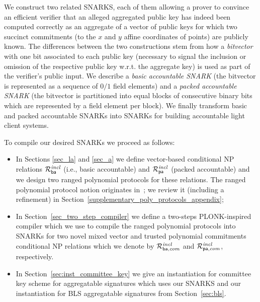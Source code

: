 \label{sec:snarks}

We construct two related SNARKS, each of them allowing a prover to convince an 
efficient verifier that an alleged aggregated public key has indeed been computed correctly as an aggregate 
of a vector of public keys for which two succinct commitments (to the $x$ and $y$ affine coordinates of points) are publicly known. The differences between the two  
constructions stem from how a \emph{bitvector} with one bit associated to each public key 
(necessary to signal the inclusion or omission of the respective public key w.r.t. the aggregate key) 
is used as part of the verifier's public input. We describe a 
\emph{basic accountable SNARK} (the bitvector is represented as a sequence of $0/1$ field elements) and a \emph{packed accountable SNARK} (the bitvector is 
partitioned into equal blocks of consecutive binary bits which are represented by a field element per block). 
We finally transform basic and packed accountable SNARKs into SNARKs for building accountable light client systems. 

\noindent To compile our desired SNARKs we proceed as follows:
\begin{itemize}
\item In Sections \ref{sec_la} and \ref{sec_a} we define vector-based conditional NP relations $\mathcal{R}^{\mathit{incl}}_{\mathsf{ba}}$ (i.e., basic accountable) and $\mathcal{R}^{\mathit{incl}}_{\mathsf{pa}}$ (packed accountable) and we design two ranged polynomial protocols for these relations. The ranged polynomial protocol notion originates in~\cite{plonk}; 
we review it (including a refinement) in Section~\ref{supplementary_poly_protocols_appendix};  
\item In Section~\ref{sec_two_step_compiler} we define a two-steps PLONK-inspired compiler which we use to compile the ranged polynomial protocols into 
SNARKs for two novel mixed vector and trusted polynomial commitments conditional NP relations which we denote by 
$\mathcal{R}^{\mathit{incl}}_{\mathsf{ba},\mathit{com}}$ and $\mathcal{R}^{\mathit{incl}}_{\mathsf{pa},\mathit{com}}$, respectively. 
\item In Section~\ref{sec:inst_committee_key} we give an instantiation for committee key scheme for aggregatable signatures which uses our SNARKS 
 and our instantiation for BLS aggregatable signatures from Section~\ref{sec:bls}. 
\end{itemize}

